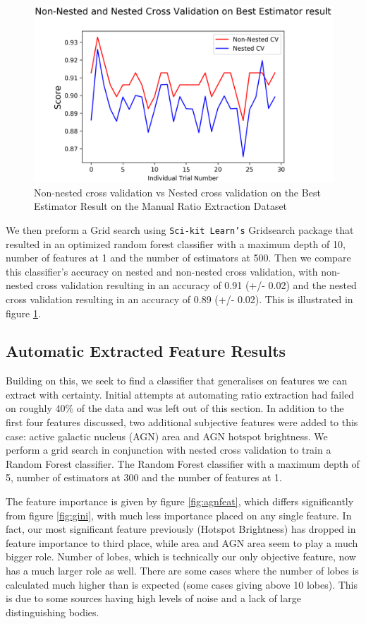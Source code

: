 \documentclass[conference]{IEEEtran}
\begin{document}
\begin{figure}[ht]
    \centering
    \includegraphics[width=0.5 \textwidth]{EPS/ee.eps}
    \caption{Non-nested cross validation vs Nested cross validation on the Best Estimator Result on the Manual Ratio Extraction Dataset}
    \label{fig:nested}
\end{figure}

We then preform a Grid search using \texttt{Sci-kit Learn's} Gridsearch package that resulted in an optimized random forest classifier with a maximum depth of 10, number of features at 1 and the number of estimators at 500. Then we compare this classifier's accuracy on nested and non-nested cross validation, with non-nested cross validation resulting in an accuracy of 0.91 (+/- 0.02) and the nested cross validation resulting in an accuracy of 0.89 (+/- 0.02). This is illustrated in figure \ref{fig:nested}.

\subsection{Automatic Extracted Feature Results}

Building on this, we seek to find a classifier that generalises on features we can extract with certainty. Initial attempts at automating ratio extraction had failed on roughly 40\% of the data and was left out of this section. In addition to the first four features discussed, two additional subjective features were added to this case: active galactic nucleus (AGN) area and AGN hotspot brightness. We perform a grid search in conjunction with nested cross validation to train a Random Forest classifier. The Random Forest classifier with a maximum depth of 5, number of estimators at 300 and the number of features at 1.

The feature importance is given by figure \ref{fig:agnfeat}, which differs significantly from figure \ref{fig:gini}, with much less importance placed on any single feature. In fact, our most significant feature previously (Hotspot Brightness) has dropped in feature importance to third place, while area and AGN area seem to play a much bigger role. Number of lobes, which is technically our only objective feature, now has a much larger role as well. There are some cases where the number of lobes is calculated much higher than is expected (some cases giving above 10 lobes). This is due to some sources having high levels of noise and a lack of large distinguishing bodies. 
\end{document}
